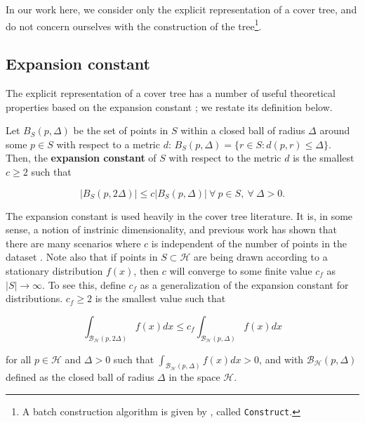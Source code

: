 In our work here, we consider only the explicit representation of a cover tree,
and do not concern ourselves with the construction of the tree\footnote{A batch
construction algorithm is given by \citet{langford2006}, called
\texttt{Construct}.}.

\subsection{Expansion constant}

The explicit representation of a cover tree has a number of useful theoretical
properties based on the expansion constant \citep{karger2002finding}; we restate
its definition below.

\begin{defn}
\label{def:int_dim}
Let $B_S(p, \Delta)$ be the set of points in $S$ within a closed ball of radius
$\Delta$ around some $p \in S$ with respect to a metric $d$:
%
$B_S(p, \Delta) = \{ r \in S \colon d(p, r) \leq \Delta \}$.
%
Then, the {\bf expansion constant} of $S$ with respect to the metric $d$ is the
smallest $c \ge 2$ such that

\begin{equation}
| B_S(p, 2 \Delta) | \le c | B_S(p, \Delta) |\ \forall\ p \in S,\
\forall\ \Delta > 0.
\end{equation}

\end{defn}

The expansion constant is used heavily in the cover tree literature.  It is,
in some sense, a notion of instrinic dimensionality, and previous work has shown
that there are many scenarios where $c$ is independent of the number of points
in the dataset \citep{karger2002finding, langford2006,
krauthgamer2004navigating, ram2009}.  Note also that if points in $S \subset
\mathcal{H}$ are being drawn according to a stationary distribution $f(x)$, then
$c$ will converge to some finite value $c_f$ as $|S| \to \infty$.  To see this,
define $c_f$ as a generalization of the expansion constant for distributions.
$c_f \ge 2$ is the smallest value such that

\begin{equation}
\int_{\mathcal{B}_{\mathcal{H}}(p, 2 \Delta)} f(x) dx \le c_{f}
\int_{\mathcal{B}_{\mathcal{H}}(p, \Delta)} f(x)
dx
\end{equation}

\noindent for all $p \in \mathcal{H}$ and $\Delta > 0$ such that
$\int_{\mathcal{B}_{\mathcal{H}}(p, \Delta)} f(x) dx > 0$, and with
$\mathcal{B}_{\mathcal{H}}(p, \Delta)$ defined as the closed ball of radius
$\Delta$ in the space $\mathcal{H}$.

